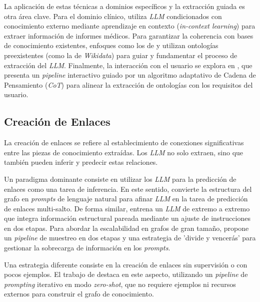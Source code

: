 La aplicación de estas técnicas a dominios específicos y la extracción guiada es otra área clave. Para el dominio clínico, \parencite{liAutomatedClinicalData2024} utiliza \textit{LLM} condicionados con conocimiento externo mediante aprendizaje en contexto (\textit{in-context learning}) para extraer información de informes médicos. Para garantizar la coherencia con bases de conocimiento existentes, enfoques como los de \parencite{fengOntologygroundedAutomaticKnowledge2024} y \parencite{mccuskerLOKELinkedOpen2023} utilizan ontologías preexistentes (como la de \textit{Wikidata}) para guiar y fundamentar el proceso de extracción del \textit{LLM}. Finalmente, la interacción con el usuario se explora en \parencite{abolhasaniLeveragingLLMAutomated2024}, que presenta un \textit{pipeline} interactivo guiado por un algoritmo adaptativo de Cadena de Pensamiento (\textit{CoT}) para alinear la extracción de ontologías con los requisitos del usuario.

\subsection{Creación de Enlaces}
La creación de enlaces se refiere al establecimiento de conexiones significativas entre las piezas de conocimiento extraídas. Los \textit{LLM} no solo extraen, sino que también pueden inferir y predecir estas relaciones.

Un paradigma dominante consiste en utilizar los \textit{LLM} para la predicción de enlaces como una tarea de inferencia. En este sentido, \parencite{shuKnowledgeGraphLarge2024} convierte la estructura del grafo en \textit{prompts} de lenguaje natural para afinar \textit{LLM} en la tarea de predicción de enlaces multi-salto. De forma similar, \parencite{heLinkGPTTeachingLarge2024} entrena un \textit{LLM} de extremo a extremo que integra información estructural pareada mediante un ajuste de instrucciones en dos etapas. Para abordar la escalabilidad en grafos de gran tamaño, \parencite{biLPNLScalableLink2024} propone un \textit{pipeline} de muestreo en dos etapas y una estrategia de 'divide y vencerás' para gestionar la sobrecarga de información en los \textit{prompts}.

\newpage

Una estrategia diferente consiste en la creación de enlaces sin supervisión o con pocos ejemplos. El trabajo de \parencite{cartaIterativeZeroShotLLM2023} destaca en este aspecto, utilizando un \textit{pipeline} de \textit{prompting} iterativo en modo \textit{zero-shot}, que no requiere ejemplos ni recursos externos para construir el grafo de conocimiento.

